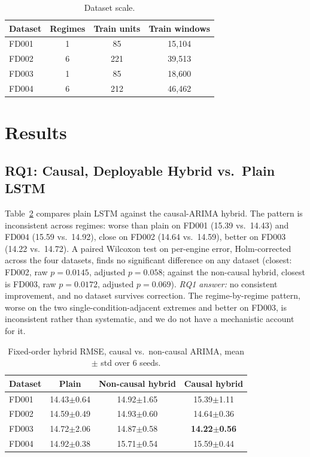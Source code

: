 \documentclass[conference]{IEEEtran}
\begin{document}
\begin{table}[t]
\centering
\caption{Dataset scale.}
\label{tab:meta}
\footnotesize
\begin{tabular}{lccc}
\toprule
Dataset & Regimes & Train units & Train windows \\
\midrule
FD001 & 1 & 85 & 15{,}104 \\
FD002 & 6 & 221 & 39{,}513 \\
FD003 & 1 & 85 & 18{,}600 \\
FD004 & 6 & 212 & 46{,}462 \\
\bottomrule
\end{tabular}
\end{table}

\section{Results}

\subsection{RQ1: Causal, Deployable Hybrid vs.\ Plain LSTM}
Table~\ref{tab:causal} compares plain LSTM against the causal-ARIMA hybrid. The pattern is inconsistent across regimes: worse than plain on FD001 (15.39 vs.\ 14.43) and FD004 (15.59 vs.\ 14.92), close on FD002 (14.64 vs.\ 14.59), better on FD003 (14.22 vs.\ 14.72). A paired Wilcoxon test on per-engine error, Holm-corrected across the four datasets, finds no significant difference on any dataset (closest: FD002, raw $p=0.0145$, adjusted $p=0.058$; against the non-causal hybrid, closest is FD003, raw $p=0.0172$, adjusted $p=0.069$). \emph{RQ1 answer:} no consistent improvement, and no dataset survives correction. The regime-by-regime pattern, worse on the two single-condition-adjacent extremes and better on FD003, is inconsistent rather than systematic, and we do not have a mechanistic account for it.

\begin{table}[t]
\centering
\caption{Fixed-order hybrid RMSE, causal vs.\ non-causal ARIMA, mean $\pm$ std over 6 seeds.}
\label{tab:causal}
\footnotesize
\begin{tabular}{lccc}
\toprule
Dataset & Plain & Non-causal hybrid & Causal hybrid \\
\midrule
FD001 & 14.43{\tiny$\pm$0.64} & 14.92{\tiny$\pm$1.65} & 15.39{\tiny$\pm$1.11} \\
FD002 & 14.59{\tiny$\pm$0.49} & 14.93{\tiny$\pm$0.60} & 14.64{\tiny$\pm$0.36} \\
FD003 & 14.72{\tiny$\pm$2.06} & 14.87{\tiny$\pm$0.58} & \textbf{14.22{\tiny$\pm$0.56}} \\
FD004 & 14.92{\tiny$\pm$0.38} & 15.71{\tiny$\pm$0.54} & 15.59{\tiny$\pm$0.44} \\
\bottomrule
\end{tabular}
\end{table}
\end{document}
